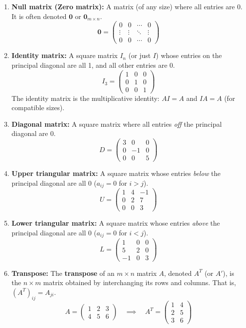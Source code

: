 \begin{enumerate}
    \item \textbf{Null matrix (Zero matrix):} A matrix (of any size) where all entries are 0. It is often denoted $\mathbf{0}$ or $\mathbf{0}_{m \times n}$.
    \[ \mathbf{0} = \begin{pmatrix} 0 & 0 & \cdots & 0 \\ \vdots & \vdots & \ddots & \vdots \\ 0 & 0 & \cdots & 0 \end{pmatrix} \]
    \item \textbf{Identity matrix:} A square matrix $I_n$ (or just $I$) whose entries on the principal diagonal are all 1, and all other entries are 0.
    \[ I_3 = \begin{pmatrix} 1 & 0 & 0 \\ 0 & 1 & 0 \\ 0 & 0 & 1 \end{pmatrix} \]
    The identity matrix is the multiplicative identity: $AI = A$ and $IA = A$ (for compatible sizes).
    \item \textbf{Diagonal matrix:} A square matrix where all entries \emph{off} the principal diagonal are 0.
    \[ D = \begin{pmatrix} 3 & 0 & 0 \\ 0 & -1 & 0 \\ 0 & 0 & 5 \end{pmatrix} \]
    \item \textbf{Upper triangular matrix:} A square matrix whose entries \emph{below} the principal diagonal are all 0 ($a_{ij} = 0$ for $i > j$).
    \[ U = \begin{pmatrix} 1 & 4 & -1 \\ 0 & 2 & 7 \\ 0 & 0 & 3 \end{pmatrix} \]
    \item \textbf{Lower triangular matrix:} A square matrix whose entries \emph{above} the principal diagonal are all 0 ($a_{ij} = 0$ for $i < j$).
    \[ L = \begin{pmatrix} 1 & 0 & 0 \\ 5 & 2 & 0 \\ -1 & 0 & 3 \end{pmatrix} \]
    \item \textbf{Transpose:} The \textbf{transpose} of an $m \times n$ matrix $A$, denoted $A^T$ (or $A'$), is the $n \times m$ matrix obtained by interchanging its rows and columns. That is, $(A^T)_{ij} = A_{ji}$.
    \[ A = \begin{pmatrix} 1 & 2 & 3 \\ 4 & 5 & 6 \end{pmatrix} \quad \implies \quad A^T = \begin{pmatrix} 1 & 4 \\ 2 & 5 \\ 3 & 6 \end{pmatrix} \]

\end{enumerate}
